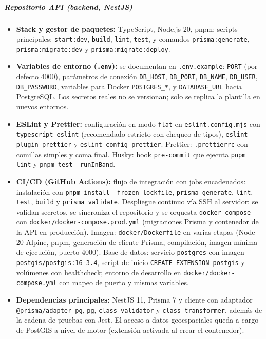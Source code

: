 \subparagraph{Repositorio API (backend, NestJS)}
\begin{itemize}
    \item \textbf{Stack y gestor de paquetes:} TypeScript, Node.js 20, pnpm; scripts principales: \texttt{start:dev}, \texttt{build}, \texttt{lint}, \texttt{test}, y comandos \texttt{prisma:generate}, \texttt{prisma:migrate:dev} y \texttt{prisma:migrate:deploy}.
    \item \textbf{Variables de entorno (\texttt{.env}):} se documentan en \texttt{.env.example}: \texttt{PORT} (por defecto 4000), parámetros de conexión \texttt{DB\_HOST}, \texttt{DB\_PORT}, \texttt{DB\_NAME}, \texttt{DB\_USER}, \texttt{DB\_PASSWORD}, variables para Docker \texttt{POSTGRES\_*}, y \texttt{DATABASE\_URL} hacia PostgreSQL. Los secretos reales no se versionan; solo se replica la plantilla en nuevos entornos.
    \item \textbf{ESLint y Prettier:} configuración en modo \texttt{flat} en \texttt{eslint.config.mjs} con \texttt{typescript-eslint} (recomendado estricto con chequeo de tipos), \texttt{eslint-plugin-prettier} y \texttt{eslint-config-prettier}. Prettier: \texttt{.prettierrc} con comillas simples y coma final. Husky: hook \texttt{pre-commit} que ejecuta \texttt{pnpm lint} y \texttt{pnpm test --runInBand}.
    \item \textbf{CI/CD (GitHub Actions):} flujo de integración con jobs encadenados: instalación con \texttt{pnpm install --frozen-lockfile}, \texttt{prisma generate}, \texttt{lint}, \texttt{test}, \texttt{build} y \texttt{prisma validate}. Despliegue continuo vía SSH al servidor: se validan secretos, se sincroniza el repositorio y se orquesta \texttt{docker compose} con \texttt{docker/docker-compose.prod.yml} (migraciones Prisma y contenedor de la API en producción). Imagen: \texttt{docker/Dockerfile} en varias etapas (Node 20 Alpine, pnpm, generación de cliente Prisma, compilación, imagen mínima de ejecución, puerto 4000). Base de datos: servicio \texttt{postgres} con imagen \texttt{postgis/postgis:16-3.4}, script de inicio \texttt{CREATE EXTENSION postgis} y volúmenes con healthcheck; entorno de desarrollo en \texttt{docker/docker-compose.yml} con mapeo de puerto y mismas variables.
    \item \textbf{Dependencias principales:} NestJS 11, Prisma 7 y cliente con adaptador \texttt{@prisma/adapter-pg}, \texttt{pg}, \texttt{class-validator} y \texttt{class-transformer}, además de la cadena de pruebas con Jest. El acceso a datos geoespaciales queda a cargo de PostGIS a nivel de motor (extensión activada al crear el contenedor).
\end{itemize}

